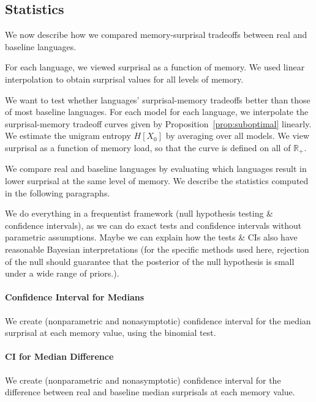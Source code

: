 \documentclass[11pt,letterpaper]{article}
\begin{document}
\subsection{Statistics}

We now describe how we compared memory-surprisal tradeoffs between real and baseline languages.

For each language, we viewed surprisal as a function of memory.
We used linear interpolation to obtain surprisal values for all levels of memory.

We want to test whether languages' surprisal-memory tradeoffs better than those of most baseline languages.
For each model for each language, we interpolate the surprisal-memory tradeoff curves given by Proposition~\ref{prop:suboptimal} linearly.
We estimate the unigram entropy $H[X_0]$ by averaging over all models.
We view surprisal as a function of memory load, so that the curve is defined on all of $\mathbb{R}_+$.


We compare real and baseline languages by evaluating which languages result in lower surprisal at the same level of memory.
We describe the statistics computed in the following paragraphs.

We do everything in a frequentist framework (null hypothesis testing \& confidence intervals), as we can do exact tests and confidence intervals without parametric assumptions.
Maybe we can explain how the tests \& CIs also have reasonable Bayesian interpretations (for the specific methods used here, rejection of the null should guarantee that the posterior of the null hypothesis is small under a wide range of priors.).

\paragraph{Confidence Interval for Medians}
We create (nonparametric and nonasymptotic) confidence interval for the median surprisal at each memory value, using the binomial test.



\paragraph{CI for Median Difference}
We create (nonparametric and nonasymptotic) confidence interval for the difference between real and baseline median surprisals at each memory value.
\end{document}
